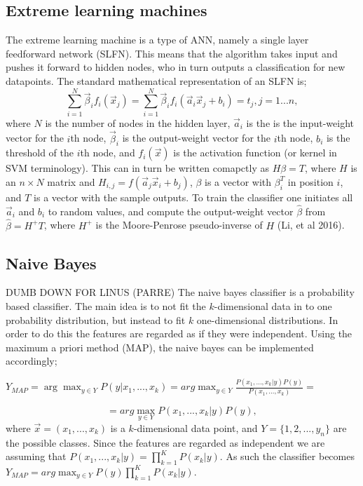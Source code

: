 \documentclass{article}
\begin{document}
\subsection{Extreme learning machines}
The extreme learning machine is a type of ANN, namely a single layer feedforward network (SLFN). This means that the algorithm takes input and pushes it forward to hidden nodes, who in turn outputs a classification for new datapoints. The standard mathematical representation of an SLFN is;
\begin{equation}
\sum\limits_{i = 1}^N \vec{\beta}_i f_i (\vec{x}_j)  = \sum\limits_{i = 1}^N \vec{\beta}_i f_i (\vec{a}_i  \vec{x}_j + b_i)= t_j, j = 1...n, 
\end{equation}
where $N$ is the number of nodes in the hidden layer, $\vec{a}_i$ is the is the input-weight vector for the $i$th node, $\vec{\beta}_i$ is the output-weight vector for the $i$th node, $b_i$ is the threshold of the $i$th node, and $f_i(\vec{x})$ is the activation function (or kernel in SVM terminology). This can in turn be written comapctly as $H\beta = T$, where $H$ is an $n \times N$ matrix and $H_{i, j} = f(\vec{a}_j\vec{x}_i + b_j)$, $\beta$ is a vector with $\beta_i^T$ in position $i$, and $T$ is a vector with the sample outputs. To train the classifier one initiates all $\vec{a}_i$ and $b_i$ to random values, and compute the output-weight vector $\hat{\beta}$ from $\hat\beta = H^+ T$, where $H^+$ is the Moore-Penrose pseudo-inverse of $H$ (Li, et al 2016).

\subsection{Naive Bayes}
DUMB DOWN FOR LINUS (PARRE)
The naive bayes classifier is a probability based classifier. The main idea is to not fit the $k$-dimensional data in to one probability distribution, but instead to fit $k$ one-dimensional distributions. In order to do this the features are regarded as if they were independent. Using the maximum a priori method (MAP), the naive bayes can be implemented accordingly;
\begin{center}
$Y_{MAP} = \arg \max_{y \in Y} P(y | x_1, ..., x_k) = arg \max_{y \in Y} \frac{ P( x_1, ..., x_k | y)P(y) }{P(x_1, ..., x_k)}=$
\end{center}
\begin{equation}
 = arg \max_{y \in Y} P(x_1, ..., x_k|y)P(y) ,
\end{equation}
where $\vec{x} = (x_1, ..., x_k)$ is a $k$-dimensional data point, and $Y = \{1, 2, ...,y_n\}$ are the possible classes. Since the features are regarded as independent we are assuming that $P(x_1, ..., x_k| y) = \prod_{k=1}^{K} P(x_k |y).$ As such the classifier becomes $Y_{MAP} = arg \max_{y \in Y} P(y)\prod_{k=1}^{K}P(x_k|y)$.
\end{document}
